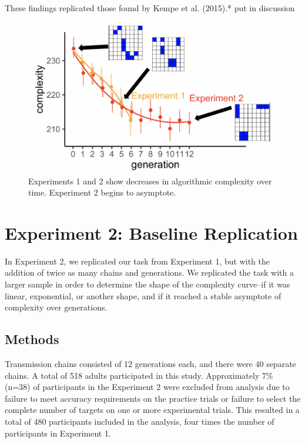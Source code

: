 \documentclass[10pt, letterpaper]{article}
\newenvironment{CodeChunk}{}{}
\begin{document}
These findings replicated those found by Kempe et al. (2015).* put in
discussion

\begin{CodeChunk}
\begin{figure}[tb]

{\centering \includegraphics{figs/baseline_bothExp_withplots-1} 

}

\caption[Experiments 1 and 2 show decreases in algorithmic complexity over time]{Experiments 1 and 2 show decreases in algorithmic complexity over time. Experiment 2 begins to asymptote.}\label{fig:baseline_bothExp_withplots}
\end{figure}
\end{CodeChunk}

\hypertarget{experiment-2-baseline-replication}{%
\section{Experiment 2: Baseline
Replication}\label{experiment-2-baseline-replication}}

In Experiment 2, we replicated our task from Experiment 1, but with the
addition of twice as many chains and generations. We replicated the task
with a larger sample in order to determine the shape of the complexity
curve--if it was linear, exponential, or another shape, and if it
reached a stable asymptote of complexity over generations.

\hypertarget{methods}{%
\subsection{Methods}\label{methods}}

Transmission chains consisted of 12 generations each, and there were 40
separate chains. A total of 518 adults participated in this study.
Approximately 7\% (n=38) of participants in the Experiment 2 were
excluded from analysis due to failure to meet accuracy requirements on
the practice trials or failure to select the complete number of targets
on one or more experimental trials. This resulted in a total of 480
participants included in the analysis, four times the number of
participants in Experiment 1.
\end{document}
